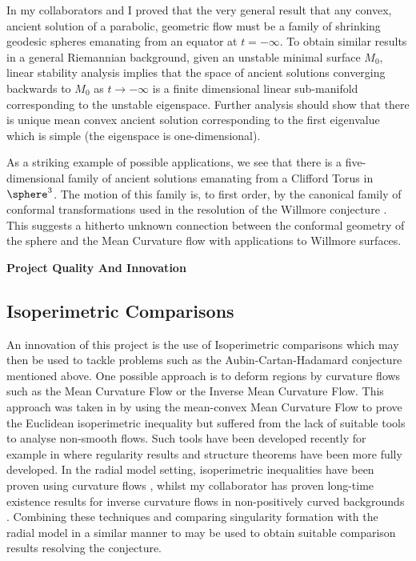 \documentclass[12pt]{amsart}
\begin{document}
In \cite{2016arXiv160401694B} my collaborators and I proved that the very general result that any convex, ancient solution of a parabolic, geometric flow must be a family of shrinking geodesic spheres emanating from an equator at $t=-\infty$. To obtain similar results in a general Riemannian background, given an unstable minimal surface $M_0$, linear stability analysis implies that the space of ancient solutions converging backwards to $M_0$ as $t\to-\infty$ is a finite dimensional linear sub-manifold corresponding to the unstable eigenspace. Further analysis should show that there is unique mean convex ancient solution corresponding to the first eigenvalue which is simple (the eigenspace is one-dimensional).

As a striking example of possible applications, we see that there is a five-dimensional family of ancient solutions emanating from a Clifford Torus in $\sphere^3$. The motion of this family is, to first order, by the canonical family of conformal transformations used in the resolution of the Willmore conjecture \cite{MR3152944}. This suggests a hitherto unknown connection between the conformal geometry of the sphere and the Mean Curvature flow with applications to Willmore surfaces.

\smallskip\noindent\textbf{Project Quality And Innovation}
\label{sec-3}

\subsection*{Isoperimetric Comparisons}
\label{sec-3-1}

An innovation of this project is the use of Isoperimetric comparisons which may then be used to tackle problems such as the Aubin-Cartan-Hadamard conjecture mentioned above. One possible approach is to deform regions by curvature flows such as the Mean Curvature Flow or the Inverse Mean Curvature Flow. This approach was taken in \cite{MR2420018} by using the mean-convex Mean Curvature Flow to prove the Euclidean isoperimetric inequality but suffered from the lack of suitable tools to analyse non-smooth flows. Such tools have been developed recently for example in \cite{MR3570481,2013arXiv1304.0926H} where regularity results and structure theorems have been more fully developed. In the radial model setting, isoperimetric inequalities have been proven using curvature flows \cite{MR3439091,2016arXiv160908238G}, whilst my collaborator has proven long-time existence results for inverse curvature flows in non-positively curved backgrounds \cite{MR3581327}. Combining these techniques and comparing singularity formation with the radial model in a similar manner to \cite{MR1650335} may be used to obtain suitable comparison results resolving the conjecture.
\end{document}
